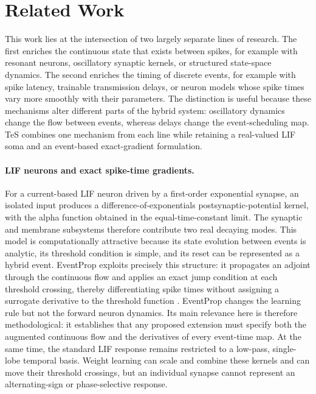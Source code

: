 \section{Related Work}
\label{sec:related-work}

This work lies at the intersection of two largely separate lines of research. The first enriches the continuous state that exists between spikes, for example with resonant neurons, oscillatory synaptic kernels, or structured state-space dynamics. The second enriches the timing of discrete events, for example with spike latency, trainable transmission delays, or neuron models whose spike times vary more smoothly with their parameters. The distinction is useful because these mechanisms alter different parts of the hybrid system: oscillatory dynamics change the flow between events, whereas delays change the event-scheduling map. TeS combines one mechanism from each line while retaining a real-valued LIF soma and an event-based exact-gradient formulation.

\paragraph{LIF neurons and exact spike-time gradients.}
For a current-based LIF neuron driven by a first-order exponential synapse, an isolated input produces a difference-of-exponentials postsynaptic-potential kernel, with the alpha function obtained in the equal-time-constant limit. The synaptic and membrane subsystems therefore contribute two real decaying modes. This model is computationally attractive because its state evolution between events is analytic, its threshold condition is simple, and its reset can be represented as a hybrid event. EventProp exploits precisely this structure: it propagates an adjoint through the continuous flow and applies an exact jump condition at each threshold crossing, thereby differentiating spike times without assigning a surrogate derivative to the threshold function \cite{wunderlich2021eventprop}. EventProp changes the learning rule but not the forward neuron dynamics. Its main relevance here is therefore methodological: it establishes that any proposed extension must specify both the augmented continuous flow and the derivatives of every event-time map. At the same time, the standard LIF response remains restricted to a low-pass, single-lobe temporal basis. Weight learning can scale and combine these kernels and can move their threshold crossings, but an individual synapse cannot represent an alternating-sign or phase-selective response.

